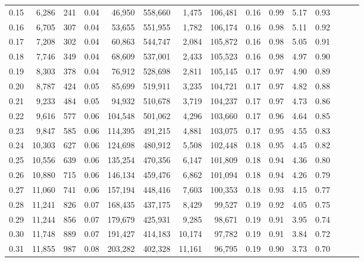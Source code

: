 \begin{tabular}{rrrrrrrrrrrrrrr}
0.15 &   6,286 &    241 &  0.04 &   46,950 &  558,660 &    1,475 &  106,481 &  0.16 &  0.99 &  5.17 &      0.93 \\
0.16 &   6,705 &    307 &  0.04 &   53,655 &  551,955 &    1,782 &  106,174 &  0.16 &  0.98 &  5.11 &      0.92 \\
0.17 &   7,208 &    302 &  0.04 &   60,863 &  544,747 &    2,084 &  105,872 &  0.16 &  0.98 &  5.05 &      0.91 \\
0.18 &   7,746 &    349 &  0.04 &   68,609 &  537,001 &    2,433 &  105,523 &  0.16 &  0.98 &  4.97 &      0.90 \\
0.19 &   8,303 &    378 &  0.04 &   76,912 &  528,698 &    2,811 &  105,145 &  0.17 &  0.97 &  4.90 &      0.89 \\
0.20 &   8,787 &    424 &  0.05 &   85,699 &  519,911 &    3,235 &  104,721 &  0.17 &  0.97 &  4.82 &      0.88 \\
0.21 &   9,233 &    484 &  0.05 &   94,932 &  510,678 &    3,719 &  104,237 &  0.17 &  0.97 &  4.73 &      0.86 \\
0.22 &   9,616 &    577 &  0.06 &  104,548 &  501,062 &    4,296 &  103,660 &  0.17 &  0.96 &  4.64 &      0.85 \\
0.23 &   9,847 &    585 &  0.06 &  114,395 &  491,215 &    4,881 &  103,075 &  0.17 &  0.95 &  4.55 &      0.83 \\
0.24 &  10,303 &    627 &  0.06 &  124,698 &  480,912 &    5,508 &  102,448 &  0.18 &  0.95 &  4.45 &      0.82 \\
0.25 &  10,556 &    639 &  0.06 &  135,254 &  470,356 &    6,147 &  101,809 &  0.18 &  0.94 &  4.36 &      0.80 \\
0.26 &  10,880 &    715 &  0.06 &  146,134 &  459,476 &    6,862 &  101,094 &  0.18 &  0.94 &  4.26 &      0.79 \\
0.27 &  11,060 &    741 &  0.06 &  157,194 &  448,416 &    7,603 &  100,353 &  0.18 &  0.93 &  4.15 &      0.77 \\
0.28 &  11,241 &    826 &  0.07 &  168,435 &  437,175 &    8,429 &   99,527 &  0.19 &  0.92 &  4.05 &      0.75 \\
0.29 &  11,244 &    856 &  0.07 &  179,679 &  425,931 &    9,285 &   98,671 &  0.19 &  0.91 &  3.95 &      0.74 \\
0.30 &  11,748 &    889 &  0.07 &  191,427 &  414,183 &   10,174 &   97,782 &  0.19 &  0.91 &  3.84 &      0.72 \\
0.31 &  11,855 &    987 &  0.08 &  203,282 &  402,328 &   11,161 &   96,795 &  0.19 &  0.90 &  3.73 &      0.70 \\

\end{tabular}

